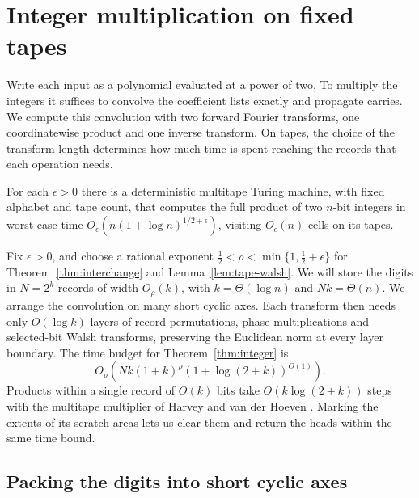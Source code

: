 \section{Integer multiplication on fixed tapes}\label{sec:integers}

Write each input as a polynomial evaluated at a power of two. To
multiply the integers it suffices to convolve the coefficient lists
exactly and propagate carries. We compute this convolution with two
forward Fourier transforms, one coordinatewise product and one
inverse transform. On tapes, the choice of the transform length
determines how much time is spent reaching the records that each
operation needs.

\begin{theorem}\label{thm:integer}
For each \(\epsilon>0\) there is a deterministic multitape Turing
machine, with fixed alphabet and tape count, that computes the full
product of two \(n\)-bit integers in worst-case time
\(O_\epsilon(n(1+\log n)^{1/2+\epsilon})\), visiting
\(O_\epsilon(n)\) cells on its tapes.
\end{theorem}

Fix \(\epsilon>0\), and choose a rational exponent
\(\tfrac12<\rho<\min\{1,\tfrac12+\epsilon\}\) for
Theorem~\ref{thm:interchange} and Lemma~\ref{lem:tape-walsh}.
We will store the digits in \(N=2^k\) records of width \(O_\rho(k)\),
with \(k=\Theta(\log n)\) and \(Nk=\Theta(n)\). We arrange the
convolution on many short cyclic axes. Each transform then needs
only \(O(\log k)\) layers of record permutations, phase
multiplications and selected-bit Walsh transforms, preserving
the Euclidean norm at every layer boundary. The time budget for
Theorem~\ref{thm:integer} is
\begin{equation}\label{eq:integer-budget}
 O_\rho\!\left(Nk(1+k)^\rho(1+\log(2+k))^{O(1)}\right).
\end{equation}
Products within a single record of \(O(k)\) bits take
\(O(k\log(2+k))\) steps with the multitape multiplier of
Harvey and van der Hoeven \cite{hvh}. Marking the extents of its
scratch areas lets us clear them and return the heads within the
same time bound.

\subsection{Packing the digits into short cyclic axes}

